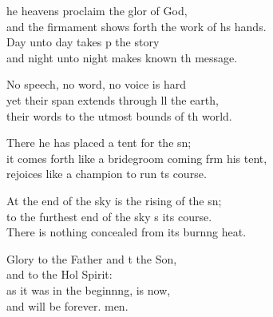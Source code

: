 \settowidth{\versewidth}{it comes forth like a bridegroom coming from his tent, *}
\begin{psalmverse}%
  \begin{patverse}
he heavens proclaim the glor of God,\Med\\
and the firmament shows forth the work of h\pointup{\i}s hands.\\
Day unto day takes p the story\Med\\
and night unto night makes known th message.

No speech, no word, no voice is hard\Flex\\
yet their span extends through ll the earth,\Med\\
their words to the utmost bounds of th world.

There he has placed a tent for the sn;\Flex\\
it comes forth like a bridegroom coming frm his tent,\Med\\
rejoices like a champion to run \pointup{\i}ts course.

At the end of the sky is the rising of the sn;\Flex\\
to the furthest end of the sky \pointup{\i}s its course.\Med\\
There is nothing concealed from its burn\pointup{\i}ng heat.

Glory to the Father and t the Son,\Med\\
and to the Hol Spirit:\\
as it was in the beginn\pointup{\i}ng, is now,\Med\\
and will be forever. men. 
  \end{patverse}
\end{psalmverse}
